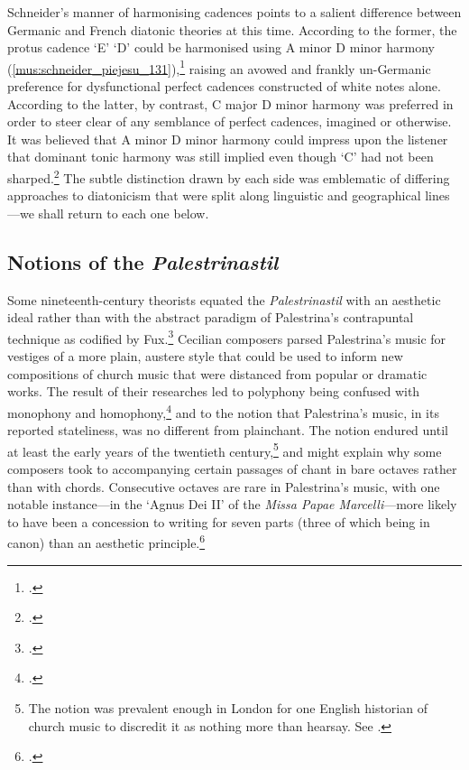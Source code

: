 Schneider's manner of harmonising cadences points to a salient difference between Germanic and French diatonic theories at this time.
According to the former, the protus cadence `E' \rightarrow{} `D' could be harmonised using A minor \rightarrow{} D minor harmony (\cref{mus:schneider_piejesu_131}),\footcite[131]{SchneiderGregorianischeChoralgesaengefuer1866} raising an avowed and frankly un-Germanic preference for dysfunctional perfect cadences constructed of white notes alone.
According to the latter, by contrast, C major \rightarrow{} D minor harmony was preferred in order to steer clear of any semblance of perfect cadences, imagined or otherwise.
It was believed that A minor \rightarrow{} D minor harmony could impress upon the listener that dominant \rightarrow{} tonic harmony was still implied even though `C' had not been sharped.\footcites[42]{NiedermeyerTraitetheoriquepratique1859}[Also discussed in][190--92]{LessmannRezeptiongregorianischenChorals2016}
The subtle distinction drawn by each side was emblematic of differing approaches to diatonicism that were split along linguistic and geographical lines---we shall return to each one below.

\subsection{Notions of the \emph{Palestrinastil}}
Some nineteenth-century theorists equated the \emph{Palestrinastil} with an aesthetic ideal rather than with the abstract paradigm of Palestrina's contrapuntal technique as codified by Fux.\footcite[18, 67]{GarrattPalestrinaGermanRomantic2002}
Cecilian composers parsed Palestrina's music for vestiges of a more plain, austere style that could be used to inform new compositions of church music that were distanced from popular or dramatic works.
The result of their researches led to polyphony being confused with monophony and homophony,\footcite[191]{EllisInterpretingMusicalEarly2005} and to the notion that Palestrina's music, in its reported stateliness, was no different from plainchant.
The notion endured until at least the early years of the twentieth century,\footnote{The notion was prevalent enough in London for one English historian of church music to discredit it as nothing more than hearsay. See \cite[pp.~115--116 n.~*]{BurgessTextbookPlainsongGregorian1906}.} and might explain why some composers took to accompanying certain passages of chant in bare octaves rather than with chords.
Consecutive octaves are rare in Palestrina's music, with one notable instance---in the `Agnus Dei II' of the \emph{Missa Papae Marcelli}---more likely to have been a concession to writing for seven parts (three of which being in canon) than an aesthetic principle.\footcite[p.~69 see bar 6 between the first alto and first bass parts; Lockwood does not mention the consecutive octaves in his commentary]{LockwoodGiovanniPierluigiPalestrina1975}

